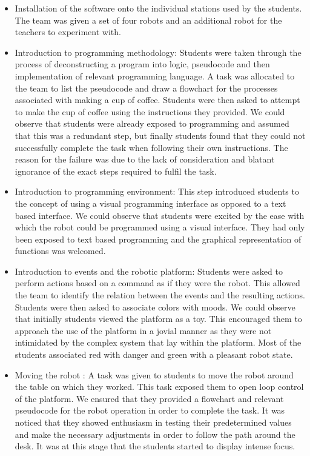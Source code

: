 \documentclass{intech-journal}
\begin{document}
\begin{itemize}
\item Installation of the software onto the individual stations used by the students. The team was given a set of four robots and an additional robot for the teachers to experiment with.
\item Introduction to programming methodology: Students were taken through the process of deconstructing a program into logic, pseudocode and then implementation of relevant programming language. 
A task was allocated to the team to list the pseudocode and draw a flowchart for the processes associated with making a cup of coffee. Students were then asked to attempt to make the cup of coffee using the instructions they provided. 
We could observe that students were already exposed to programming and assumed that this was a redundant step, but finally students found that they could not successfully complete the task when following their own instructions. 
The reason for the failure was due to the lack of consideration and blatant ignorance of the exact steps required to fulfil the task.
\item Introduction to programming environment: This step introduced students to the concept of using a visual programming interface as opposed to a text based interface.  
We could observe that students were excited by the ease with which the robot could be programmed using a visual interface. 
They had only been exposed to text based programming and the graphical representation of functions was welcomed.
\item Introduction to events and the robotic platform: Students were asked to perform actions based on a command as if they were the robot. 
This allowed the team to identify the relation between the events and the resulting actions. 
Students were then asked to associate colors with moods. We could observe that initially students viewed the platform as a toy. 
This encouraged them to approach the use of the platform in a jovial manner as they were not intimidated by the complex system that lay within the platform. 
Most of the students associated red with danger and green with a pleasant robot state.
\item Moving the robot : A task was given to students to move the robot around the table on which they worked. This task exposed them to open loop control of the platform. We ensured that they provided a flowchart and relevant pseudocode for the robot operation in order to complete the task. It was noticed that they showed enthusiasm in testing their predetermined values and make the necessary adjustments in order to follow the path around the desk. It was at this stage that the students started to display intense focus.

\end{itemize}
\end{document}
